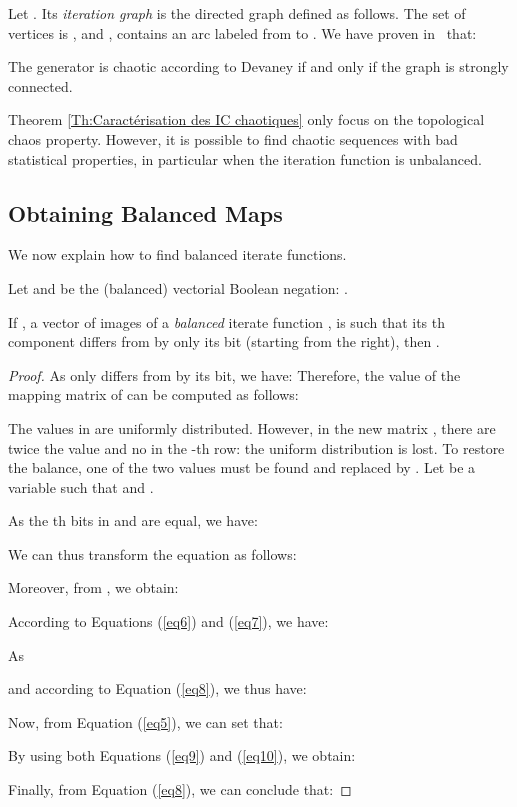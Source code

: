 \documentclass[conference]{IEEEtran}
\begin{document}
Let . Its
{\emph{iteration graph}}  is the directed graph defined as follows. 
The set of vertices is
, and ,
 contains an arc labeled  from  to . 
We have proven in~\cite{GuyeuxThese10} that:


\begin{theorem}
\label{Th:Caractérisation   des   IC   chaotiques}
The  generator is chaotic according to Devaney if and only if the graph  is strongly connected.
\end{theorem}

Theorem \ref{Th:Caractérisation   des   IC   chaotiques} only focus on the topological chaos property.
However, it is possible to find chaotic sequences with bad statistical properties, in particular when the iteration function is unbalanced.


\subsection{Obtaining Balanced Maps}
\label{The generation of pseudo-random sequence}



We now explain how to find balanced iterate functions.

\begin{theorem}
Let  and  be the (balanced) vectorial Boolean negation: .

If , a vector of images of a \emph{balanced} iterate function , is such that its th component differs from  by only its  bit (starting from the right), then .
\end{theorem}

\begin{proof}
As  only differs from  by its  bit, we have: 
Therefore, the value  of the mapping matrix of  can be computed as follows:

The values in  are uniformly distributed.
However, in the new matrix , there are twice the value  and no  in the -th row: the uniform distribution is lost. 
To restore the balance, one of the two  values must be found and replaced by . Let  be a variable such that  and .


As the th bits in  and  are equal, we have:


We can thus transform the equation  as follows:


Moreover, from , we obtain:


According to Equations (\ref{eq6}) and (\ref{eq7}), we have:


As

and according to Equation (\ref{eq8}), we thus have:
 

Now, from Equation (\ref{eq5}), we can set that:


By using both Equations (\ref{eq9}) and (\ref{eq10}), we obtain:



Finally, from Equation (\ref{eq8}), we can conclude that:

\end{proof}
\end{document}
